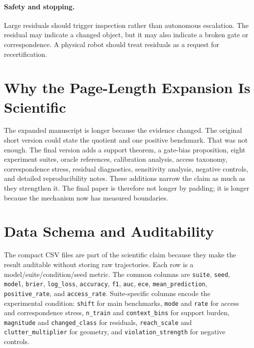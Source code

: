 \documentclass{article}
\begin{document}
\paragraph{Safety and stopping.}
Large residuals should trigger inspection rather than autonomous escalation. The residual may indicate a changed object, but it may also indicate a broken gate or correspondence. A physical robot should treat residuals as a request for recertification.

\section{Why the Page-Length Expansion Is Scientific}

The expanded manuscript is longer because the evidence changed. The original short version could state the quotient and one positive benchmark. That was not enough. The final version adds a support theorem, a gate-bias proposition, eight experiment suites, oracle references, calibration analysis, access taxonomy, correspondence stress, residual diagnostics, sensitivity analysis, negative controls, and detailed reproducibility notes. These additions narrow the claim as much as they strengthen it. The final paper is therefore not longer by padding; it is longer because the mechanism now has measured boundaries.

\section{Data Schema and Auditability}

The compact CSV files are part of the scientific claim because they make the result auditable without storing raw trajectories. Each row is a model/suite/condition/seed metric. The common columns are \texttt{suite}, \texttt{seed}, \texttt{model}, \texttt{brier}, \texttt{log\_loss}, \texttt{accuracy}, \texttt{f1}, \texttt{auc}, \texttt{ece}, \texttt{mean\_prediction}, \texttt{positive\_rate}, and \texttt{access\_rate}. Suite-specific columns encode the experimental condition: \texttt{shift} for main benchmarks, \texttt{mode} and \texttt{rate} for access and correspondence stress, \texttt{n\_train} and \texttt{context\_bins} for support burden, \texttt{magnitude} and \texttt{changed\_class} for residuals, \texttt{reach\_scale} and \texttt{clutter\_multiplier} for geometry, and \texttt{violation\_strength} for negative controls.
\end{document}
